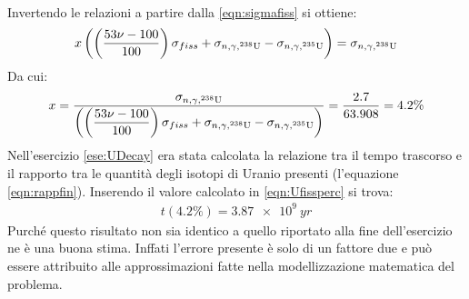 \documentclass[../main.tex]{subfile}
\begin{document}
\begin{svol}
\begin{gather}
		\end{gather}
		Invertendo le relazioni a partire dalla \ref{eqn:sigmafiss} si ottiene:
		\begin{gather}
		x\left(\left(\dfrac{53\nu-100}{100}\right)\sigma_{fiss}+\sigma_{n,\gamma,^{238}\mathrm{U}}-\sigma_{n,\gamma,^{235}\mathrm{U}}\right)=\sigma_{n,\gamma,^{238}\mathrm{U}}
		\end{gather}
		Da cui:
		\begin{gather}
		\label{eqn:Ufissperc}
		x=\dfrac{\sigma_{n,\gamma,^{238}\mathrm{U}}}{\left(\left(\dfrac{53\nu-100}{100}\right)\sigma_{fiss}+\sigma_{n,\gamma,^{238}\mathrm{U}}-\sigma_{n,\gamma,^{235}\mathrm{U}}\right)}=\dfrac{2.7}{63.908}=4.2\%
		\end{gather}
		Nell'esercizio \ref{ese:UDecay} era stata calcolata la relazione tra il tempo trascorso e il rapporto tra le quantità degli isotopi di Uranio presenti (l'equazione \ref{eqn:rappfin}). Inserendo il valore calcolato in \ref{eqn:Ufissperc} si trova:
		\begin{gather}
		t(4.2\%)=\SI{3.87e9}{yr}
		\end{gather}
		Purché questo risultato non sia identico a quello riportato alla fine dell'esercizio ne è una buona stima. Inffati l'errore presente è solo di un fattore due e può essere attribuito alle approssimazioni fatte nella modellizzazione matematica del problema.
	\end{svol}
\end{document}
